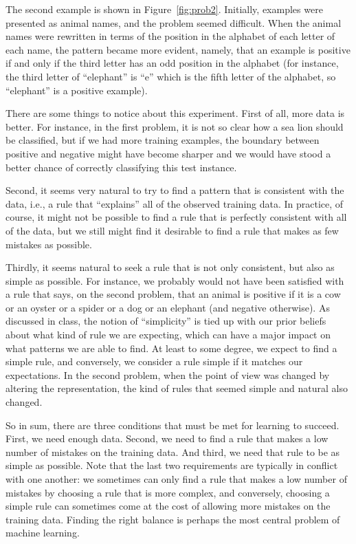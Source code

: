 \documentclass[11pt]{article}
\begin{document}
The second example is shown in Figure~\ref{fig:prob2}.
Initially, examples were presented as animal names, and the problem seemed
difficult.
When the animal names were rewritten in terms of the position in the
alphabet of each letter of each name, the pattern became more
evident, namely, that an example is positive if and only if the third
letter has an odd position in the alphabet (for instance, the third
letter of ``elephant'' is ``e'' which is the fifth letter of the alphabet,
so ``elephant'' is a positive example).

There are some things to notice about this experiment.
First of all, more data is better.
For instance, in the first problem, it is not so clear how a sea lion
should be classified, but if we had more training examples, 
the boundary between positive
and negative might have become sharper and we would have stood a
better chance of correctly classifying this test instance.

Second, it seems very natural to try to find a pattern that is
consistent with the data, i.e., a rule that ``explains'' all of the
observed training data.
In practice, of course, it might not be possible to find a rule that
is perfectly consistent with all of the data, but we still might find
it desirable to find a rule that makes as few mistakes as possible.

Thirdly, it seems natural to seek a rule that is not only
consistent, but also as simple as possible.
For instance, we probably would not have been satisfied with a rule
that says, on the second problem, that an animal is positive if it is
a cow or an oyster or a spider or a dog or an elephant (and negative otherwise).
As discussed in class, the notion of ``simplicity'' is tied up with
our prior beliefs about what kind of rule we are expecting, which can have
a major impact on what patterns we are able to find.
At least to some degree, we expect to find a simple rule,
and conversely, we consider a rule simple if it matches our expectations.
In the second problem, when the point of view was changed by altering
the representation, the kind of rules that seemed simple and natural
also changed.

So in sum, there are three conditions that must be met for learning to
succeed.
First, we need enough data.
Second, we need to find a rule that makes a low number of mistakes on
the training data.
And third, we need that rule to be as simple as possible.
Note that the last two requirements are typically in conflict with one
another:
we sometimes can only find a rule that makes a low number of mistakes
by choosing a rule that is more complex, and conversely, choosing a
simple rule can sometimes come at the cost of allowing more mistakes
on the training data.
Finding the right balance is perhaps the most central problem of
machine learning.
\end{document}
